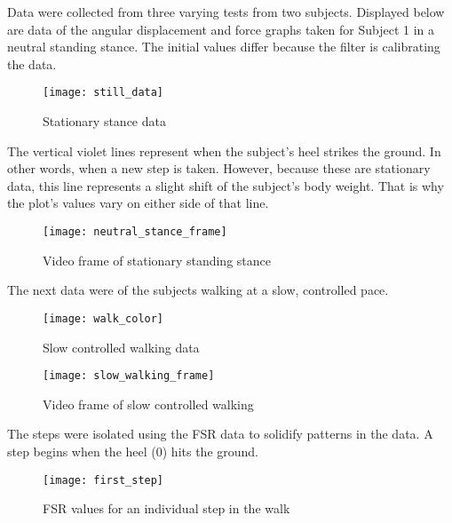 Data were collected from three varying tests from two subjects.
Displayed below are data of the angular displacement and force graphs taken for Subject 1 in a neutral standing stance.
The initial values differ because the filter is calibrating the data.\par

\begin{figure}[p]
  \centering
  \texttt{[image: still\_data]}
  \caption[Stationary stance data]{Stationary stance data}
  \label{fig:x neutral data}
\end{figure}

The vertical violet lines represent when the subject’s heel strikes the ground.
In other words, when a new step is taken.
However, because these are stationary data, this line represents a slight shift of the subject’s body weight.
That is why the plot’s values vary on either side of that line.\par

\begin{figure}[h]
  \centering
  \texttt{[image: neutral\_stance\_frame]}
  \caption[Stationary stance frame]{Video frame of stationary standing stance}
  \label{fig:x neutral frame}
\end{figure}

The next data were of the subjects walking at a slow, controlled pace.\par

\begin{figure}[p]
  \centering
  \texttt{[image: walk\_color]}
  \caption[Slow walking data]{Slow controlled walking data}
  \label{fig:x slow data}
\end{figure}

\begin{figure}[h]
  \centering
  \texttt{[image: slow\_walking\_frame]}
  \caption[Slow walking frame]{Video frame of slow controlled walking}
  \label{fig:x slow frame}
\end{figure}

The steps were isolated using the FSR data to solidify patterns in the data. A step begins when the heel (0) hits the ground.\par

\begin{figure}[h]
  \centering
  \texttt{[image: first\_step]}
  \caption[FSR step values]{FSR values for an individual step in the walk}
  \label{fig:x fsr step}
\end{figure}

